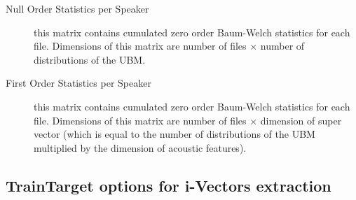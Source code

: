 \begin{description}
%
\item[Null Order Statistics per Speaker] this matrix contains cumulated zero order Baum-Welch statistics for each file. Dimensions of this matrix are number of files $\times$ number of distributions of the UBM.
%
\item[First Order Statistics per Speaker] this matrix contains cumulated zero order Baum-Welch statistics for each file. Dimensions of this matrix are number of files $\times$ dimension of super vector (which is equal to the number of distributions of the UBM multiplied by the dimension of acoustic features).
\end{description}

\newpage
\subsection{TrainTarget options for i-Vectors extraction}


